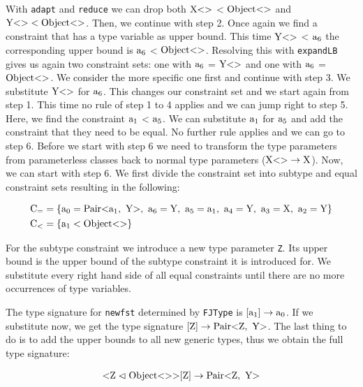 With \verb|adapt| and \verb|reduce| we can drop both $\text{X} \text{<}  \text{>}$ < $\text{Object} \text{<}  \text{>}$ and $\text{Y} \text{<}  \text{>} < \text{Object} \text{<}  \text{>}$. Then, we continue with step 2.
Once again we find a constraint that has a type variable as upper bound. This time $\text{Y} \text{<}  \text{>}$ < $\text{a}_{6}$ the corresponding upper bound is $\text{a}_{6}$ < $\text{Object} \text{<}  \text{>}$.
Resolving this with \verb|expandLB| gives us again two constraint sets: one with $\text{a}_{6}$ = $\text{Y} \text{<}  \text{>}$ and one with $\text{a}_{6}$ = $\text{Object} \text{<}  \text{>}$. We consider the more specific one first and continue with step 3.
We substitute $\text{Y} \text{<}  \text{>}$ for $\text{a}_{6}$. This changes our constraint set and we start again from step 1. This time no rule of step 1 to 4 applies and we can jump right to step 5.
Here, we find the constraint $\text{a}_{1}$ < $\text{a}_{5}$. We can substitute $\text{a}_{1}$ for $\text{a}_{5}$ and add the constraint that they need to be equal.
No further rule applies and we can go to step 6. Before we start with step 6 we need to transform the type parameters from parameterless classes back to normal type parameters ($\text{X} \text{<}  \text{>} \to \text{X}$). Now, we can start with step 6. We first divide the constraint set into subtype and equal constraint sets resulting in the following:

\begin{align*}
    \text{C}_= &= \{ \fa{0} = \nvtt{Pair}{\fa{1}, \ \text{Y}}, \ \fa{6} = \text{Y}, \ \fa{5} = \fa{1}, \ \fa{4} = \text{Y}, \ \fa{3} = \text{X}, \ \fa{2} = \text{Y} \}\\
    \text{C}_< &= \{ \fa{1} < \nvtt{Object}{} \}
\end{align*}

For the subtype constraint we introduce a new type parameter \verb|Z|. Its upper bound is the upper bound of the subtype constraint it is introduced for.
We substitute every right hand side of all equal constraints until there are no more occurrences of type variables.

The type signature for \verb|newfst| determined by \verb|FJType| is $[\text{a}_{1}] \to \text{a}_{0}$. If we substitute now, we get the type signature $[\text{Z}] \to \nvtt{Pair}{\text{Z}, \ \text{Y}}$.
The last thing to do is to add the upper bounds to all new generic types, thus we obtain the full type signature:

\begin{align*}
    \text{<} \text{Z} \vartriangleleft \nvtt{Object}{}\text{>}[\text{Z}] \to \nvtt{Pair}{\text{Z}, \ \text{Y}}\\
\end{align*}

